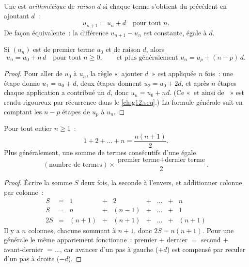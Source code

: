 \begin{definition}\label{def:g11:seq:arithmetic}
Une  est \emph{arithmétique} de
\emph{raison} $d$ si chaque terme s'obtient du précédent en ajoutant
$d$~:
\[
u_{n+1} = u_n + d \quad \text{pour tout } n.
\]
De façon équivalente~: la différence $u_{n+1} - u_n$ est constante,
égale à $d$.
\end{definition}

\begin{theorem}\label{thm:g11:seq:arithgeneral}
Si $(u_n)$ est  de premier terme $u_0$ et de raison $d$,
alors
\[
u_n = u_0 + n\,d \quad \text{pour tout } n \geq 0,
\qquad\text{et plus généralement } u_n = u_p + (n - p)\,d .
\]
\end{theorem}

\begin{proof}
Pour aller de $u_0$ à $u_n$, la règle «~ajouter $d$~» est appliquée $n$
fois~: une étape donne $u_1 = u_0 + d$, deux étapes donnent
$u_2 = u_0 + 2d$, et après $n$ étapes chaque application a contribué un
$d$, donc $u_n = u_0 + nd$. (Ce «~et ainsi de ~» est rendu
rigoureux par récurrence dans le \cref{ch:g12:seq}.) La formule générale
suit en comptant les $n - p$ étapes de $u_p$ à $u_n$.
\end{proof}

\begin{theorem}\label{thm:g11:seq:intsum}
Pour tout entier $n \geq 1$~:
\[
1 + 2 + \dots + n = \frac{n(n+1)}{2}.
\]
Plus généralement, une somme de termes consécutifs d'une  égale
\[
(\text{nombre de termes}) \times
\frac{\text{premier terme} + \text{dernier terme}}{2}.
\]
\end{theorem}

\begin{proof}
Écrire la somme $S$ deux fois, la seconde à l'envers, et additionner
colonne par colonne~:
\[
\begin{array}{ccccccccc}
S & = & 1 & + & 2 & + & \dots & + & n\\
S & = & n & + & (n-1) & + & \dots & + & 1\\
\hline
2S & = & (n+1) & + & (n+1) & + & \dots & + & (n+1)
\end{array}
\]
Il y a $n$ colonnes, chacune sommant à $n + 1$, donc $2S = n(n+1)$. Pour
une  générale le même appariement fonctionne~: premier
$+$ dernier $=$ second $+$ avant-dernier $= \dots$, car avancer d'un pas
à gauche ($+d$) est compensé par reculer d'un pas à droite ($-d$).
\end{proof}

